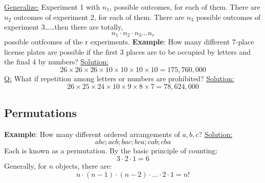 \documentclass[11pt, letterpaper]{article}
\begin{document}
\noindent\underline{Generalize:} \newline
Experiment 1 with $n_1$, possible outcomes, for each of them. There are $n_2$ outcomes of experiment 2, for each of them. There are $n_3$ possible outcomes of experiment 3\dots\dots then there are totally, \newline
\begin{equation*}
  n_1 \cdot n_2 \cdot n_3 \dots n_r
\end{equation*}
possible outfcomes of the r experiments. \newline \newline
\noindent
\textbf{Example}: How many different 7-place license plates are possible if the first 3 places are to be occupied by letters and the final 4 by numbers? \newline \newline
\noindent
\underline{Solution:}
\begin{equation*}
  26 \times 26 \times 26 \times 10 \times 10 \times 10 \times 10 = 175,760,000
\end{equation*}
\underline{Q:} What if repetition among letters or numbers are prohibited? \newline \newline
\underline{Solution:}
\begin{equation*}
  26 \times 25 \times 24 \times 10 \times 9 \times 8 \times 7 = 78,624,000
\end{equation*}

\subsection{Permutations}
\textbf{Example}: How many different ordered arrangements of $a, b, c$? \newline \newline
\noindent
\underline{Solution:}
\begin{equation*}
  abc; acb; bac; bca; cab; cba
\end{equation*}
Each is known as a permutation.
By the basic principle of counting:
\begin{equation*}
  3 \cdot 2 \cdot 1 = 6
\end{equation*}
\newline
\noindent
Generally, for $n$ objects, there are:
\begin{equation*}
  n \cdot (n-1) \cdot (n-2) \cdot \dots \cdot 2 \cdot 1 = n!
\end{equation*}
\end{document}
